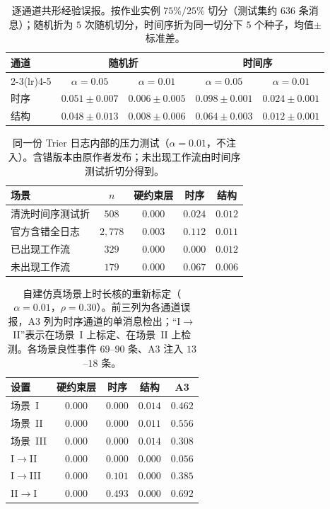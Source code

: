 \documentclass[manuscript,screen,review]{acmart}
\begin{document}
\begin{table}[!t]
\renewcommand{\arraystretch}{1.12}
\caption{逐通道共形经验误报。按作业实例 $75\%/25\%$ 切分（测试集约 $636$ 条消息）；随机折为 $5$ 次随机切分，时间序折为同一切分下 $5$ 个种子，均值$\pm$标准差。}
\label{tab:fprsplit}
\centering
\small
\begin{tabular}{lcccc}
\toprule
通道 & \multicolumn{2}{c}{随机折} & \multicolumn{2}{c}{时间序} \\
\cmidrule(lr){2-3}\cmidrule(lr){4-5}
 & $\alpha{=}0.05$ & $\alpha{=}0.01$ & $\alpha{=}0.05$ & $\alpha{=}0.01$ \\
\midrule
时序 & $0.051{\pm}0.007$ & $0.006{\pm}0.005$ & $0.098{\pm}0.001$ & $0.024{\pm}0.001$ \\
结构 & $0.048{\pm}0.013$ & $0.008{\pm}0.006$ & $0.064{\pm}0.003$ & $0.012{\pm}0.001$ \\
\bottomrule
\end{tabular}
\end{table}

\begin{table}[!t]
\renewcommand{\arraystretch}{1.12}
\caption{同一份 {Trier} 日志内部的压力测试（$\alpha=0.01$，不注入）。含错版本由原作者发布；未出现工作流由时间序测试折切分得到。}
\label{tab:shift}
\label{tab:cprime}
\label{tab:e9}
\centering
\small
\begin{tabular}{lcccc}
\toprule
场景 & $n$ & 硬约束层 & 时序 & 结构 \\
\midrule
清洗时间序测试折 & $508$ & $0.000$ & $0.024$ & $0.012$ \\
官方含错全日志 & $2{,}778$ & $0.003$ & $0.112$ & $0.011$ \\
已出现工作流 & $329$ & $0.000$ & $0.000$ & $0.012$ \\
未出现工作流 & $179$ & $0.000$ & $0.067$ & $0.006$ \\
\bottomrule
\end{tabular}
\end{table}

\begin{table}[!t]
\renewcommand{\arraystretch}{1.12}
\caption{自建仿真场景上时长核的重新标定（$\alpha=0.01$，$\rho=0.30$）。前三列为各通道误报，{A3} 列为时序通道的单消息检出；``I$\to$II''表示在场景~I 上标定、在场景~II 上检测。各场景良性事件 $69$--$90$ 条、{A3} 注入 $13$--$18$ 条。}
\label{tab:e6}
\centering
\small
\begin{tabular}{lcccc}
\toprule
设置 & 硬约束层 & 时序 & 结构 & {A3} \\
\midrule
场景~I & $0.000$ & $0.000$ & $0.014$ & $0.462$ \\
场景~II & $0.000$ & $0.000$ & $0.011$ & $0.556$ \\
场景~III & $0.000$ & $0.000$ & $0.014$ & $0.308$ \\
I$\to$II & $0.000$ & $0.000$ & $0.000$ & $0.056$ \\
I$\to$III & $0.000$ & $0.101$ & $0.000$ & $0.385$ \\
II$\to$I & $0.000$ & $0.493$ & $0.000$ & $0.692$ \\
\bottomrule
\end{tabular}
\end{table}
\end{document}
